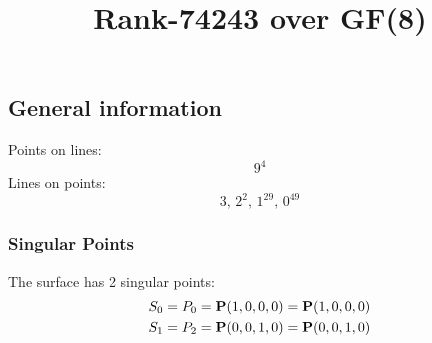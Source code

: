 \documentclass{article}
\newcommand\setTBstruts{\def\T{\rule{0pt}{2.6ex}}%
\def\B{\rule[-1.2ex]{0pt}{0pt}}}
\newcommand{\bP}{{\bf P}}
\begin{document}
 
\setTBstruts



{\allowdisplaybreaks%






\title{Rank-74243 over GF(8)}
\author{}%
\maketitle%
%
{}



\subsection*{General information}
Points on lines:
$$
9^4$$
Lines on points:
$$
3,\,2^2,\,1^{29},\,0^{49}$$
\subsubsection*{Singular Points}
The surface has 2 singular points:\\
\begin{align*}
S_{0} &= P_{0}=\bP(1, 0, 0, 0) = \bP(1, 0, 0, 0)\\
S_{1} &= P_{2}=\bP(0, 0, 1, 0) = \bP(0, 0, 1, 0)\\
\end{align*}
}
\end{document}
